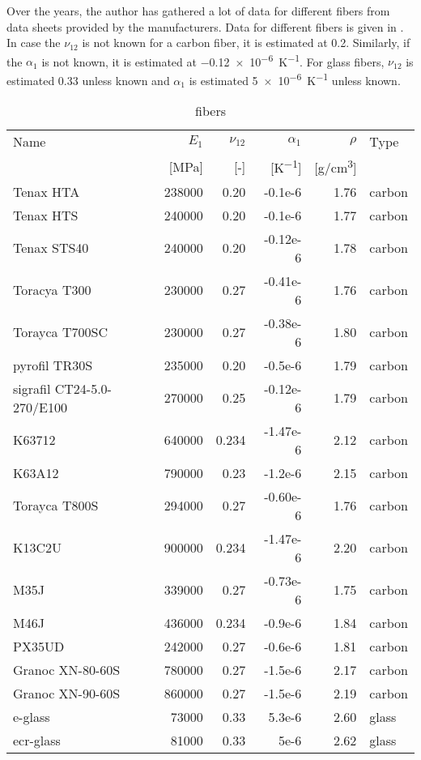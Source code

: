 \documentclass[a4paper,landscape,oneside,11pt,twocolumn]{memoir}
\begin{document}
Over the years, the author has gathered a lot of data for different fibers
from data sheets provided by the manufacturers. Data for different
fibers is given in . In case the $\nu_{12}$ is not
known for a carbon fiber, it is estimated at 0.2. Similarly, if the
$\alpha_1$ is not known, it is estimated at \SI{-0.12e-6}{K^{-1}}. For glass
fibers, $\nu_{12}$ is estimated 0.33 unless known and $\alpha_1$ is estimated
\SI{5e-6}{K^{-1}} unless known.

\begin{table}[!htbp]
  \centering
  \caption{\label{tb:fibers}fibers}
  \begin{tabular}{lrrrrl}%
      Name & $E_1$ & $\nu_{12}$ & $\alpha_1$ & $\rho$ & Type\\
      & [\si{MPa}] & [-] & [\si{K^{-1}}] & [\si{g/cm^3}]\\
    \midrule
      Tenax HTA & 238000 & 0.20 & -0.1e-6 & 1.76 & carbon\\
Tenax HTS & 240000 & 0.20 & -0.1e-6 & 1.77 & carbon\\
Tenax STS40 & 240000 & 0.20 & -0.12e-6 & 1.78 & carbon\\
Toracya T300 & 230000 & 0.27 & -0.41e-6 & 1.76 & carbon\\
Torayca T700SC & 230000 & 0.27 & -0.38e-6 & 1.80 & carbon\\
pyrofil TR30S & 235000 & 0.20 & -0.5e-6 & 1.79 & carbon\\
sigrafil CT24-5.0-270/E100 & 270000 & 0.25 & -0.12e-6 & 1.79 & carbon\\
K63712 & 640000 & 0.234 & -1.47e-6 & 2.12 & carbon\\
K63A12 & 790000 & 0.23 & -1.2e-6 & 2.15 & carbon\\
Torayca T800S & 294000 & 0.27 & -0.60e-6 & 1.76 & carbon\\
K13C2U & 900000 & 0.234 & -1.47e-6 & 2.20 & carbon\\
M35J & 339000 & 0.27 & -0.73e-6 & 1.75 & carbon\\
M46J & 436000 & 0.234 & -0.9e-6 & 1.84 & carbon\\
PX35UD & 242000 & 0.27 & -0.6e-6 & 1.81 & carbon\\
Granoc XN-80-60S & 780000 & 0.27 & -1.5e-6 & 2.17 & carbon\\
Granoc XN-90-60S & 860000 & 0.27 & -1.5e-6 & 2.19 & carbon\\
e-glass & 73000 & 0.33 & 5.3e-6 & 2.60 & glass\\
ecr-glass & 81000 & 0.33 & 5e-6 & 2.62 & glass\\
  \end{tabular}
\end{table}
\end{document}
